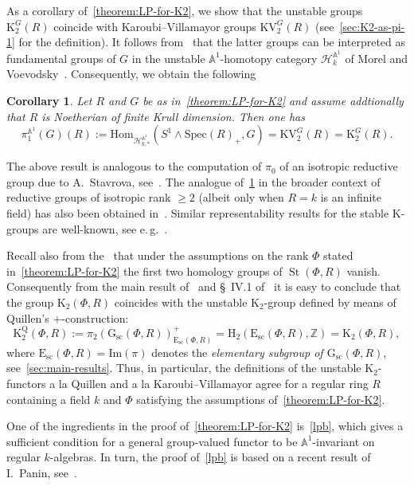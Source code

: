 \documentclass[oneside, 11pt]{amsart} \pdfoutput=1
\newcommand{\K}{{\mathrm{K}}}
\newcommand{\St}{\mathop{\mathrm{St}}\nolimits}
\newcommand{\E}{\mathrm{E}}
\newcommand{\Gsc}{\mathrm{G}_\mathrm{sc}}
\numberwithin{equation}{section}
\newtheorem{corollary}[lemma]{Corollary}
\theoremstyle{definition}
\newcommand{\ZZ}{\mathbb{Z}}
\begin{document}
As a corollary of~\cref{theorem:LP-for-K2}, we show that the unstable groups $\K_2^G(R)$ coincide with Karoubi--Villamayor groups $\mathrm{KV}_2^G(R)$ (see~\cref{sec:K2-as-pi-1} for the definition). It follows from~\cite{AHW18} that the latter groups can be interpreted as fundamental groups of $G$ in the unstable $\mathbb{A}^1$-homotopy category $\mathcal{H}^{\mathbb{A}^1}_{k}$ of Morel and Voevodsky~\cite{MV99}. Consequently, we obtain the following
\begin{corollary} \label{cor:motivic-pi1} Let $R$ and $G$ be as in~\cref{theorem:LP-for-K2} and assume addtionally that $R$ is Noetherian of finite Krull dimension.
Then one has \[\pi_1^{\mathbb{A}^1}(G)(R) := \mathrm{Hom}_{\mathcal{H}^{\mathbb{A}^1}_{k,*}}(S^1 \wedge \mathrm{Spec}(R)_+, G) = \mathrm{KV}_2^{G}(R) = \K_2^G(R).\]
\end{corollary}
The above result is analogous to the computation of $\pi_0$ of an isotropic reductive group due to A.~Stavrova, see~\cite[Theorem~5.5]{Sta20}. The analogue of~\cref{cor:motivic-pi1} in the broader context of reductive groups of isotropic rank $\geq 2$ (albeit only when $R = k$ is an infinite field) has also been obtained in~\cite{VW16}.
Similar representability results for the stable $\K$-groups are well-known, see e.\,g.~\cite{MV99, Ho05}.

Recall also from the~\cite[Theorem~5.3]{St71} that under the assumptions on the rank $\Phi$ stated in~\cref{theorem:LP-for-K2} the first two homology groups of $\St(\Phi, R)$ vanish. Consequently from the main result of~\cite{LSV20} and \S~IV.1 of~\cite{Kbook} it is easy to conclude that the group $\K_2(\Phi, R)$ coincides with the unstable $\K_2$-group defined by means of Quillen's $+$-construction:
\begin{equation} \label{eq:H2-K2}
  \K_2^\mathrm{Q}(\Phi, R) := \pi_2(\Gsc(\Phi, R))^+_{\E_\mathrm{sc}(\Phi, R)} = \mathrm{H}_2(\mathrm{E}_\mathrm{sc}(\Phi, R), \ZZ) = \K_2(\Phi, R),
\end{equation}
where $\E_\mathrm{sc}(\Phi, R) = \mathrm{Im}(\pi)$ denotes the {\it elementary subgroup of $\Gsc(\Phi, R)$}, see~\cref{sec:main-results}. Thus, in particular, the definitions of the unstable $\K_2$-functors a la Quillen and a la Karoubi--Villamayor agree for a regular ring $R$ containing a field $k$ and $\Phi$ satisfying the assumptions of~\cref{theorem:LP-for-K2}.

One of the ingredients in the proof of~\cref{theorem:LP-for-K2} is~\cref{lpb}, which gives a sufficient condition for a general group-valued functor to be $\mathbb{A}^1$-invariant on regular $k$-algebras. In turn, the proof of~\cref{lpb} is based on a recent result of I.~Panin, see~\cite[Theorem~2.5]{Pa19}. 
\end{document}
